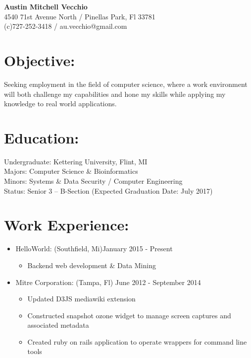 \documentclass{res}
\begin{document}
\begin{center}
\LARGE{\textbf{Austin Mitchell Vecchio}}\\
\normalsize{
4540 71st Avenue North / Pinellas Park, Fl 33781\\
(c)727-252-3418 / au.vecchio@gmail.com
}
\end{center}

\section{Objective:}
Seeking employment in the field of computer science, where a work environment will both challenge my capabilities and hone my skills while applying my knowledge to real world applications.\\

\section{Education:}
Undergraduate: Kettering University, Flint, MI\\
Majors: Computer Science \& Bioinformatics\\
Minors: Systems \& Data Security / Computer Engineering\\
Status: Senior 3 – B-Section (Expected Graduation Date: July 2017)\\

\section{Work Experience:}
\begin{itemize}
\item HelloWorld: (Southfield, Mi)\hfill January 2015 - Present
\begin{itemize}[label=$\circ$]
\item Backend web development \& Data Mining
\end{itemize}
\item Mitre Corporation: (Tampa, Fl) \hfill June 2012 - September 2014
\begin{itemize}[label=$\circ$]
\item Updated D3JS mediawiki extension
\item Constructed snapshot ozone widget to manage screen captures and associated metadata
\item Created ruby on rails application to operate wrappers for command line tools
\end{itemize}
\end{itemize}
\end{document}

